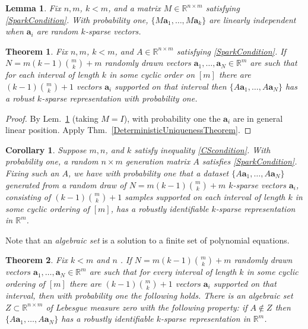 \documentclass[journal, twocolumn]{IEEEtran}
\newtheorem{theorem}{Theorem}
\newtheorem{lemma}{Lemma}
\newtheorem{corollary}{Corollary}
\begin{document}
\begin{lemma}\label{Hillar15lemma2}
Fix $n, m$, $k < m$, and a matrix $M \in \mathbb{R}^{n \times m}$ satisfying \eqref{SparkCondition}. With probability one, $\{M\mathbf{a}_1, \ldots, M\mathbf{a}_k\}$ are linearly independent when $\mathbf{a}_i$ are random $k$-sparse vectors.
\end{lemma}

\begin{theorem}\label{Theorem2}
Fix $n, m$, $k < m$, and $A \in \mathbb{R}^{n \times m}$ satisfying \eqref{SparkCondition}. If  $N = m(k-1){m \choose k}+m$ randomly drawn vectors $\mathbf{a}_1, \ldots, \mathbf{a}_N \in \mathbb{R}^m$ are such that for each interval of length $k$ in some cyclic order on $[m]$ there are $(k-1){m \choose k} + 1$ vectors $\mathbf{a}_i$ supported on that interval then $\{A\mathbf{a}_1, \ldots, A\mathbf{a}_N\}$ has a robust  $k$-sparse representation with probability one.
\end{theorem}

\begin{proof}
By Lem.~\ref{Hillar15lemma2} (taking $M = I$), with probability one the $\mathbf{a}_i$ are in general linear position. Apply Thm.~\ref{DeterministicUniquenessTheorem}.
\end{proof} 

\begin{corollary}
Suppose $m, n$, and $k$ satisfy inequality \eqref{CScondition}. With probability one, a random $n \times m$ generation matrix $A$ satisfies \eqref{SparkCondition}. Fixing such an $A$, we have with probability one that a dataset $\{A\mathbf{a}_1, \ldots , A\mathbf{a}_N\}$ generated from a random draw of $N = m(k-1){m \choose k}+m$ $k$-sparse vectors $\mathbf{a}_i$, consisting of $(k-1){m \choose k}+1$ samples supported on each interval of length $k$ in some cyclic ordering of $[m]$, has a robustly identifiable $k$-sparse representation in $\mathbb{R}^m$.
\end{corollary}

Note that an \emph{algebraic set} is a solution to a finite set of polynomial equations. 

\begin{theorem}\label{Theorem3}
Fix $k < m$ and $n$ . If $N = m(k-1){m \choose k}+m$ randomly drawn vectors $\mathbf{a}_1, \ldots, \mathbf{a}_N \in \mathbb{R}^m$ are such that for every interval of length $k$ in some cyclic ordering of $[m]$ there are $(k-1){m \choose k}+1$ vectors $\mathbf{a}_i$ supported on that interval, then with probability one the following holds. There is an algebraic set $Z \subset \mathbb{R}^{n \times m}$ of Lebesgue measure zero with the following property: if $A \notin Z$ then $\{A\mathbf{a}_1, \ldots , A\mathbf{a}_N \}$ has a robustly identifiable $k$-sparse representation in $\mathbb{R}^m$.
\end{theorem}
\end{document}
